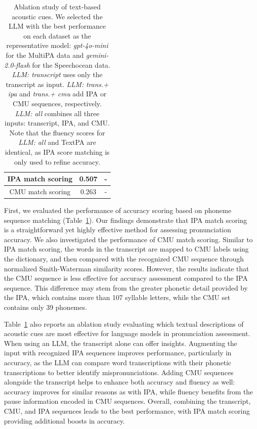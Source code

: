 \documentclass[11pt]{article}
\begin{document}
\begin{table}[t]
\begin{tabular}{|ccc|}
\multicolumn{1}{|c|}{IPA match scoring} &
  \multicolumn{1}{c|}{0.507} &
  - \\ \hline
\multicolumn{1}{|c|}{{\color[HTML]{9B9B9B} CMU match scoring}} &
  \multicolumn{1}{c|}{{\color[HTML]{9B9B9B} 0.263}} &
  {\color[HTML]{9B9B9B} -} \\ \hline
\end{tabular}
  \caption{Ablation study of text-based acoustic cues. We selected the LLM with the best performance on each dataset as the representative model: \textit{gpt-4o-mini} for the MultiPA data and \textit{gemini-2.0-flash} for the Speechocean data. \textit{LLM: transcript} uses only the transcript as input. \textit{LLM: trans.+ ipa} and \textit{trans.+ cmu} add IPA or CMU sequences, respectively. \textit{LLM: all} combines all three inputs: transcript, IPA, and CMU. Note that the fluency scores for \textit{LLM: all} and TextPA are identical, as IPA score matching is only used to refine accuracy.}
\label{tab:ablation_acoustic}
\end{table}

First, we evaluated the performance of accuracy scoring based on phoneme sequence matching (Table~\ref{tab:ablation_acoustic}). Our findings demonstrate that IPA match scoring is a straightforward yet highly effective method for assessing pronunciation accuracy. We also investigated the performance of CMU match scoring. Similar to IPA match scoring, the words in the transcript are mapped to CMU labels using the dictionary, and then compared with the recognized CMU sequence through normalized Smith-Waterman similarity scores. However, the results indicate that the CMU sequence is less effective for accuracy assessment compared to the IPA sequence. This difference may stem from the greater phonetic detail provided by the IPA, which contains more than 107 syllable letters, while the CMU set contains only 39 phonemes. 

Table~\ref{tab:ablation_acoustic} also reports an ablation study evaluating which textual descriptions of acoustic cues are most effective for language models in pronunciation assessment. When using an LLM, the transcript alone can offer insights. Augmenting the input with recognized IPA sequences improves performance, particularly in accuracy, as the LLM can compare word transcriptions with their phonetic transcriptions to better identify mispronunciations. Adding CMU sequences alongside the transcript helps to enhance both accuracy and fluency as well: accuracy improves for similar reasons as with IPA, while fluency benefits from the pause information encoded in CMU sequences. Overall, combining the transcript, CMU, and IPA sequences leads to the best performance, with IPA match scoring providing additional boosts in accuracy. 
\end{document}
